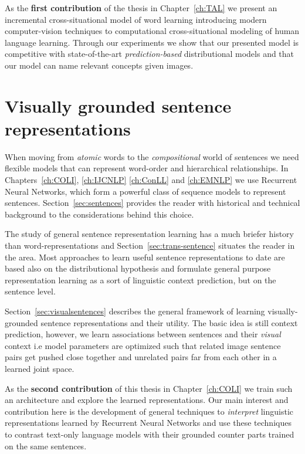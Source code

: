 As the \textbf{first contribution} of the thesis in Chapter~\ref{ch:TAL} we present an
incremental cross-situational model of word learning introducing modern computer-vision
techniques to computational cross-situational modeling of  human language learning.
Through our experiments we show that our presented model is competitive with state-of-the-art
\emph{prediction-based} distributional models and that our model can name
relevant concepts given images.

\section{Visually grounded sentence representations}

When moving from \emph{atomic} words to the \emph{compositional} world of sentences we need flexible
models that can represent word-order and hierarchical relationships.  In Chapters~\ref{ch:COLI}, \ref{ch:IJCNLP}  \ref{ch:ConLL} and \ref{ch:EMNLP}
we use Recurrent Neural Networks, which form a powerful class of  sequence models to represent sentences.
Section~\ref{sec:sentences} provides the reader with
historical and technical background to the considerations behind this choice.

The study of general sentence representation learning has a much briefer history than word-representations
and Section~\ref{sec:trans-sentence} situates the reader in the area. 
Most approaches to learn useful sentence representations to date are
based also on the distributional hypothesis and formulate general purpose representation learning as a sort of
linguistic context prediction, but on the sentence level.

Section~\ref{sec:visualsentences} describes the general framework of learning
visually-grounded sentence representations and their utility.
The basic idea is still context prediction, however, we learn associations between
sentences and their \emph{visual} context i.e model parameters are optimized such
that related image sentence pairs get pushed close together and unrelated pairs far
from each other in a learned joint space.

As the \textbf{second contribution} of this thesis in Chapter~\ref{ch:COLI}
we train such an architecture and explore the learned representations.
Our main interest and contribution here is the development of general techniques to
\emph{interpret} linguistic representations learned by
Recurrent Neural Networks and use these techniques to contrast text-only language
models with their grounded counter parts trained on the same sentences.

